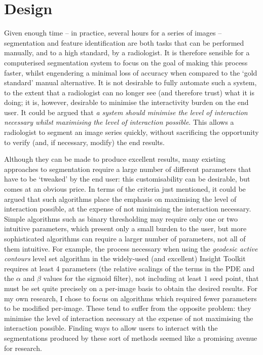 \chapter{Design}

Given enough time -- in practice, several hours for a series of images -- segmentation and feature identification are both tasks that can be performed manually, and to a high standard, by a radiologist. It is therefore sensible for a computerised segmentation system to focus on the goal of making this process faster, whilst engendering a minimal loss of accuracy when compared to the `gold standard' manual alternative. It is not desirable to fully automate such a system, to the extent that a radiologist can no longer see (and therefore trust) what it is doing; it is, however, desirable to minimise the interactivity burden on the end user. It could be argued that \emph{a system should minimise the level of interaction necessary whilst maximising the level of interaction possible}. This allows a radiologist to segment an image series quickly, without sacrificing the opportunity to verify (and, if necessary, modify) the end results.

Although they can be made to produce excellent results, many existing approaches to segmentation require a large number of different parameters that have to be `tweaked' by the end user: this customisability can be desirable, but comes at an obvious price. In terms of the criteria just mentioned, it could be argued that such algorithms place the emphasis on maximising the level of interaction possible, at the expense of not minimising the interaction necessary. Simple algorithms such as binary thresholding may require only one or two intuitive parameters, which present only a small burden to the user, but more sophisticated algorithms can require a larger number of parameters, not all of them intuitive. For example, the process necessary when using the \emph{geodesic active contours} level set algorithm in the widely-used (and excellent) Insight Toolkit \cite{itk} requires at least 4 parameters (the relative scalings of the terms in the PDE  and the $\alpha$ and $\beta$ values for the sigmoid filter), not including at least $1$ seed point, that must be set quite precisely on a per-image basis to obtain the desired results. For my own research, I chose to focus on algorithms which required fewer parameters to be modified per-image. These tend to suffer from the opposite problem: they minimise the level of interaction necessary at the expense of not maximising the interaction possible. Finding ways to allow users to interact with the segmentations produced by these sort of methods seemed like a promising avenue for research.


